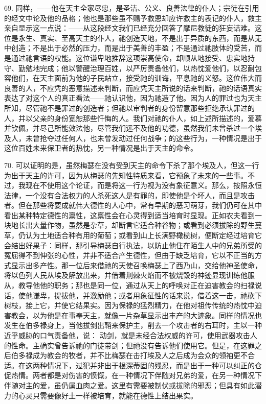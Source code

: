 69. 同样，——他在天主全家尽忠，是圣洁、公义、良善法律的仆人；宗徒在引用的经文中论及他的品格；他也是那些虽不赐予救恩却应许救主的表记的仆人，救主亲自显示这一点说：——从这段经文我们已经充分回答了摩尼教徒的狂妄诘难。这位是永生、真实、至高天主的仆人，祂创造天地，不是出于异质的东西，而是从无中创造；不是出于必然的压力，而是出于美善的丰盈；不是通过祂肢体的受苦，而是通过祂言语的权能。这位谦卑地推辞这项崇高使命，却顺从地接受、忠实地持守、勤勉地完成；他以警醒治理百姓，以严厉责备他们，以热忱爱他们，以忍耐包容他们，在天主面前为他的子民站立，接受祂的训诲，平息祂的义怒。这位伟大而良善的人，不应凭的恶意描述来判断，而应凭天主所说的话来判断，祂的话语真实表达了对这个人的真正看法——祂认识他，因为祂造了他。因为人的罪过也为天主所知，尽管祂不是罪过的创造者；但祂以审判者的身份留意那些拒绝承认罪过的人，并以父亲的身份宽恕那些忏悔的人。我们对祂的仆人，如上述所描述的，爱慕并钦佩，并尽己所能效法他，尽管我们远不及他的功德，虽然我们未曾杀过一个埃及人，未曾抢夺过任何人，也未曾发动过任何战争；的这些行为，一种情况是出于这位百姓未来保卫者的热忱，另一种情况是出于天主的命令。\par

70. 可以证明的是，虽然梅瑟在没有受到天主的命令下杀了那个埃及人，但这一行为出于天主的许可，因为从梅瑟的先知性特质来看，它预象了未来的一些事。不过，我现在不使用这个论证，而是将这一行为视为没有象征意义。那么，按照永恒法律，一个没有合法权力的人杀死这人是有罪的，即使他是个坏人，而且是攻击者。但在那些将要成就伟大德性的人心中，常有早期的恶习萌芽，我们仍可在其中看出某种特定德性的禀性，这禀性会在心灵得到适当培育时显现。正如农夫看到一块地长出大量作物，虽然是杂草，却断言它适合种谷物；或看到必须拔除的野生蔓草，仍认为土地适合种有用的葡萄；或看到山上长满野橄榄树，便断定经过培育它会结出好果子：同样，那引导梅瑟自行执法，以防止他住在陌生人中的兄弟所受的冤屈得不到伸张的心性，并非不适合产生德性，但由于缺乏培育，它以不正当的方式显示出多产性。那一位后来借祂的天使召唤梅瑟上了西乃山，交给他神圣使命，将以色列人民从埃及解放出来，并借着荆棘火焰而不被烧毁的神迹显现训练他服从，教导他他的职务；那也是同一位，通过从天上的呼唤对正在迫害教会的扫禄说话，使他谦卑，提拔他，并激励他；或者用象征性的话来说，借着这一击，祂砍下树枝，接上它，并使它结果实。因为保禄的猛烈精力，在他对祖传传统的热忱中迫害教会，以为他是在事奉天主，就像一片杂草显示出丰产的大迹象。同样的情况也发生在伯多禄身上，当他拔剑出鞘来保护主，削去一个攻击者的右耳时，主以一种近乎威胁的口气责备他，说： 动剑，就是未经合法权威的许可，使用武器攻击人的性命。主确实曾告诉祂的门徒带剑；但祂没有告诉他们使用它。但是，在这罪之后伯多禄成为教会的牧者，并不比梅瑟在击打埃及人之后成为会众的领袖更不合适。在这两种情况下，过犯并非出于根深蒂固的残忍，而是出于一种可以纠正的仓促热情。两者都是对伤害的愤慨，在一种情况下伴随对兄弟的爱，在另一种情况下伴随对主的爱，虽仍属血肉之爱。这里有需要被制伏或拔除的邪恶；但具有如此潜力的心灵只需要像好土一样被培育，就能在德性上结出果实。\par

